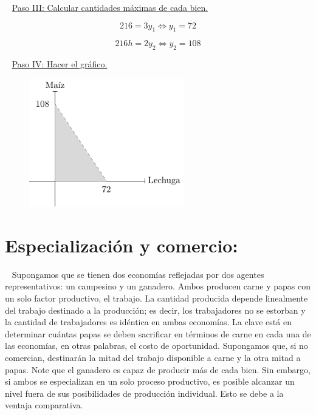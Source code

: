\documentclass[
  letterpaper,
  DIV=11,
  numbers=noendperiod]{scrreport}
\begin{document}
\begin{tcolorbox}
~ \ul{Paso III: Calcular cantidades máximas de cada bien.}

\[
216=3y_1 \Leftrightarrow y_1=72
\]

\[
216h=2y_2 \Leftrightarrow y_2=108
\]

~ \ul{Paso IV: Hacer el gráfico.}

\begin{figure}[H]

{\centering \includegraphics[width=0.6\textwidth,height=\textheight]{intro_files/figure-pdf/unnamed-chunk-2-1.pdf}

}

\end{figure}

\end{tcolorbox}

\hypertarget{especializaciuxf3n-y-comercio}{%
\section{Especialización y
comercio:}\label{especializaciuxf3n-y-comercio}}

~ Supongamos que se tienen dos economías reflejadas por dos agentes
representativos: un campesino y un ganadero. Ambos producen carne y
papas con un solo factor productivo, el trabajo. La cantidad producida
depende linealmente del trabajo destinado a la producción; es decir, los
trabajadores no se estorban y la cantidad de trabajadores es idéntica en
ambas economías. La clave está en determinar cuántas papas se deben
sacrificar en términos de carne en cada una de las economías, en otras
palabras, el costo de oportunidad. Supongamos que, si no comercian,
destinarán la mitad del trabajo disponible a carne y la otra mitad a
papas. Note que el ganadero es capaz de producir más de cada bien. Sin
embargo, si ambos se especializan en un solo proceso productivo, es
posible alcanzar un nivel fuera de sus posibilidades de producción
individual. Esto se debe a la ventaja comparativa.
\end{document}
